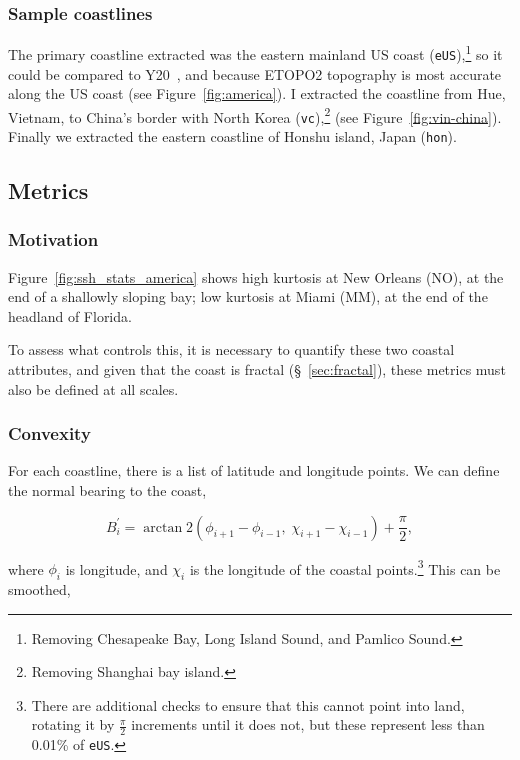 \subsubsection{Sample coastlines}
\label{sec:coast-sample}
The primary coastline extracted was the eastern mainland US coast (\texttt{eUS}),\footnote{
Removing Chesapeake Bay, Long Island Sound, and Pamlico Sound.
}
so it could be compared to Y20~\cite{ZannaPreprint},
and because ETOPO2 topography is most accurate along the
US coast (see Figure~\ref{fig:america}).
I extracted the coastline from Hue, Vietnam, to China's
border with North Korea (\texttt{vc}),\footnote{
Removing Shanghai bay island.} (see Figure~\ref{fig:vin-china}).
Finally we extracted the eastern coastline
of Honshu island, Japan (\texttt{hon}).



\subsection{Metrics}
\subsubsection{Motivation}
Figure~\ref{fig:ssh_stats_america} shows
high kurtosis at New Orleans (NO), at the end of a shallowly sloping bay;
low kurtosis at Miami (MM), at the end of the headland of Florida.

To assess what controls this,
it is necessary to quantify these two coastal attributes,
and given that the coast is fractal (§~\ref{sec:fractal}),
these metrics must also be defined at all scales.

\subsubsection{Convexity}
\label{sec:convexity}

For each coastline,
there is a list of latitude and longitude points.
We can define the normal bearing to the coast,

\begin{equation}
B_i^{\prime}=\operatorname{arctan} 2
\left(\phi_{i+1}-\phi_{i-1},\; \chi_{i+1}-\chi_{i-1}\right) +\frac{\pi}{2},
\label{eq:bearing}
\end{equation}

where $\phi_{i}$ is longitude, and $\chi_{i}$ is the longitude of the coastal points.\footnote{
There are additional checks to ensure that this cannot point into land, rotating it by $\frac{\pi}{2}$ increments until it does not,
but these represent less than 0.01\% of \texttt{eUS}.}
This can be smoothed,

